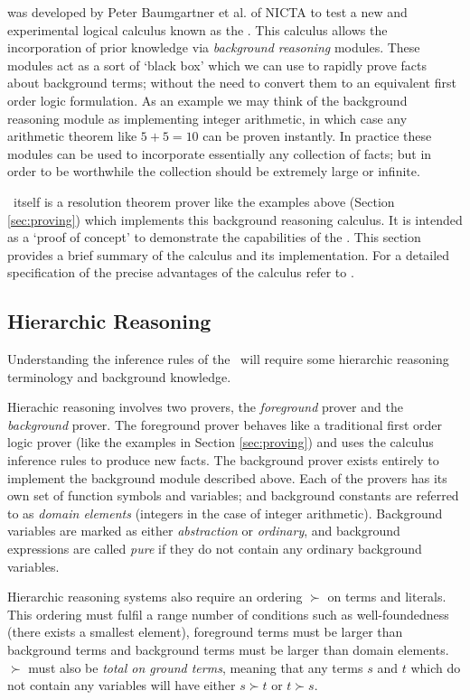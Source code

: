 {\Beagle} was developed by Peter Baumgartner et al. of NICTA to test a new
and experimental logical calculus known as the  \emph{\HSWAC} \cite{baum13}. This
calculus allows the incorporation of prior knowledge via \emph{background reasoning} modules. 
These modules act as a sort of `black box' which we can use to rapidly prove
facts about background terms; without the need to convert them to an equivalent first order logic
formulation. As an example we may think of the background reasoning module
as implementing integer arithmetic, in which case any arithmetic theorem like $5+5=10$ can be proven instantly.
In practice these modules can be used to
incorporate essentially any collection of facts; but in order to be worthwhile
the collection should be extremely large or infinite.

\Beagle\ itself is a resolution theorem prover like the examples above (Section \ref{sec:proving})
which implements this background reasoning calculus. It is intended as a `proof of concept' to
demonstrate the capabilities of the \HSWAC. This section provides a brief
summary of the calculus and its implementation. For a detailed specification
of the precise advantages of the calculus refer to \cite{baum13}.

\subsection{Hierarchic Reasoning}
\label{sec:hier}

Understanding the inference rules of the \HSWAC\ will require some hierarchic reasoning
terminology and background knowledge.

Hierachic reasoning involves two provers, the \emph{foreground} prover and the
\emph{background} prover. The foreground prover behaves like a traditional first
order logic prover (like the examples in Section \ref{sec:proving}) and uses the
calculus inference rules to produce new facts. The background prover exists entirely
to implement the background module described above. Each of the provers has its own
set of function symbols and variables; and background constants are referred to as
\emph{domain elements} (integers in the case of integer arithmetic).
Background variables are marked as either
\emph{abstraction} or \emph{ordinary}, and background expressions are called \emph{pure} if
they do not contain any ordinary background variables.

Hierarchic reasoning systems also require an ordering $\succ$ on terms and literals. This ordering
must fulfil a range number of conditions such as well-foundedness (there exists a smallest element), 
foreground terms must be larger than background terms and background terms must be larger than
domain elements. $\succ$ must also be \emph{total on ground terms}, meaning that
any terms $s$ and $t$ which do not contain any variables will have either $s \succ t$
or $t \succ s$.

